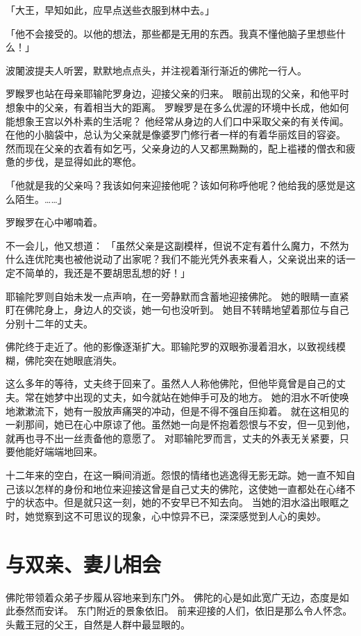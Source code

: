 \documentclass[twoside,openany]{book}
\begin{document}
「大王，早知如此，应早点送些衣服到林中去。」

「他不会接受的。以他的想法，那些都是无用的东西。我真不懂他脑子里想些什么！」

波闍波提夫人听罢，默默地点点头，并注视着渐行渐近的佛陀一行人。

罗睺罗也站在母亲耶输陀罗身边，迎接父亲的归来。
眼前出现的父亲，和他平时想象中的父亲，有着相当大的距离。
罗睺罗是在多么优渥的环境中长成，他如何能想象王宫以外朴素的生活呢？
他经常从身边的人们口中采取父亲的有关传闻。
在他的小脑袋中，总认为父亲就是像婆罗门修行者一样的有着华丽炫目的容姿。
然而现在父亲的衣着有如乞丐，父亲身边的人又都黑黝黝的，配上褴褛的僧衣和疲惫的步伐，是显得如此的寒伧。

「他就是我的父亲吗？我该如何来迎接他呢？该如何称呼他呢？他给我的感觉是这么陌生。……」

罗睺罗在心中嘟喃着。

不一会儿，他又想道：
「虽然父亲是这副模样，但说不定有着什么魔力，不然为什么连优陀夷也被他说动了出家呢？我们不能光凭外表来看人，父亲说出来的话一定不简单的，我还是不要胡思乱想的好！」

耶输陀罗则自始未发一点声响，在一旁静默而含蓄地迎接佛陀。
她的眼睛一直紧盯在佛陀身上，身边人的交谈，她一句也没听到。
她目不转睛地望着那位与自己分别十二年的丈夫。

佛陀终于走近了。他的影像逐渐扩大。耶输陀罗的双眼弥漫着泪水，以致视线模糊，佛陀突在她眼底消失。

这么多年的等待，丈夫终于回来了。虽然人人称他佛陀，但他毕竟曾是自己的丈夫。常在她梦中出现的丈夫，如今就站在她伸手可及的地方。
她的泪水不听使唤地漱漱流下，她有一股放声痛哭的冲动，但是不得不强自压抑着。
就在这相见的一刹那间，她已在心中原谅了他。虽然她一向是怀抱着怨恨与不安，但一见到他，就再也寻不出一丝责备他的意愿了。
对耶输陀罗而言，丈夫的外表无关紧要，只要他能好端端地回来。

十二年来的空白，在这一瞬间消逝。怨恨的情绪也逃逸得无影无踪。她一直不知自己该以怎样的身份和地位来迎接这曾是自己丈夫的佛陀，这使她一直都处在心绪不宁的状态中。但是就只这一刻，她的不安早已不知去向。
当她的泪水溢出眼眶之时，她觉察到这不可思议的现象，心中惊异不已，深深感觉到人心的奥妙。

\section{与双亲、妻儿相会}\label{sec8.3}

佛陀带领着众弟子步履从容地来到东门外。
佛陀的心是如此宽广无边，态度是如此泰然而安详。
东门附近的景象依旧。
前来迎接的人们，依旧是那么令人怀念。
头戴王冠的父王，自然是人群中最显眼的。
\end{document}
